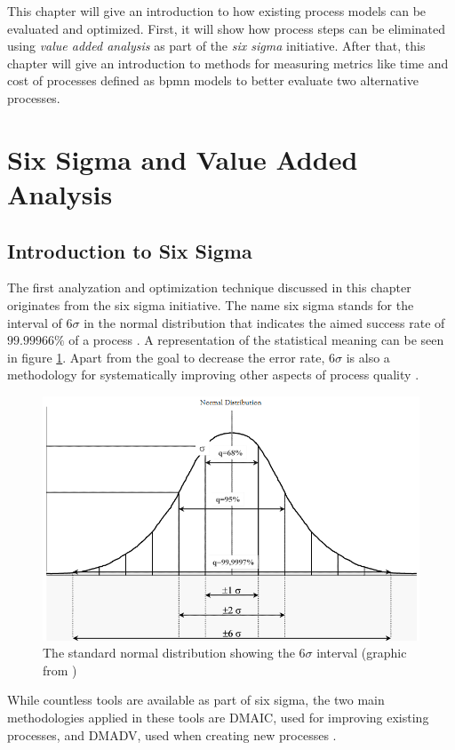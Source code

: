 \label{chapter-3}

This chapter will give an introduction to how existing process models can be evaluated and optimized. First, it will show how process steps can be eliminated using \textit{value added analysis} as part of the \textit{six sigma} initiative. After that, this chapter will give an introduction to methods for measuring metrics like time and cost of processes defined as \gls{bpmn} models to better evaluate two alternative processes.
\section{Six Sigma and Value Added Analysis}
\subsection{Introduction to Six Sigma}
The first analyzation and optimization technique discussed in this chapter originates from the six sigma initiative. The name six sigma stands for the interval of $6\sigma$ in the normal distribution that indicates the aimed success rate of $99.99966\%$ of a process \cite{siha2008business}\cite{vivekananthamoorthy2011lean}. A representation of the statistical meaning can be seen in figure \ref{fig:six-sigma}. Apart from the goal to decrease the error rate, $6\sigma$ is also a methodology for systematically improving other aspects of process quality \cite{tennant2017six}.

\begin{figure}[H]
	\centering
	\includegraphics[width=0.7\columnwidth]{graphics/six-sigma}
	\caption{The standard normal distribution showing the $6\sigma$ interval (graphic from \cite{vivekananthamoorthy2011lean})} 
	\label{fig:six-sigma} 
\end{figure}

While countless tools are available as part of six sigma, the two main methodologies applied in these tools are \gls{DMAIC}, used for improving existing processes, and \gls{DMADV}, used when creating new processes \cite{selvi2014six}.

